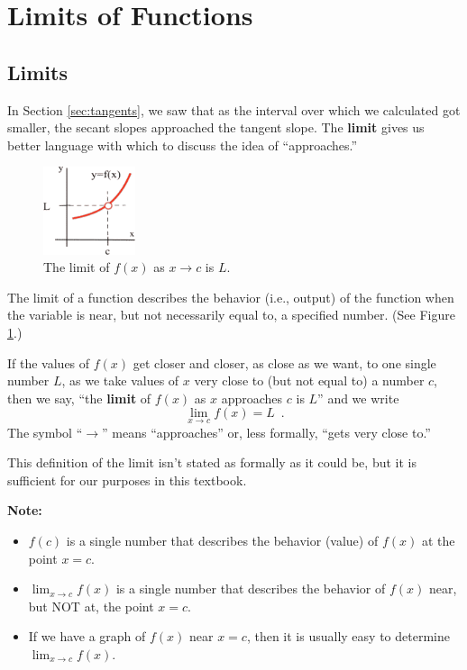 \section{Limits of Functions}
\label{sec:limits}

\subsection{Limits}
In Section \ref{sec:tangents}, we saw that as the interval over which we calculated got smaller, the secant slopes approached the tangent slope. The {\bf limit} gives us better language with which to discuss the idea of ``approaches.''
\begin{figure}
  \vspace{-20pt}
  \centering
    \includegraphics[width=0.24\textwidth]{img/chap2/image011.png} 
\caption{The limit of $f(x)$ as $x\to c$ is $L$.}
\label{fig:2-4-limits}
\vspace{-20pt}
\end{figure}
The limit of a function describes the behavior (i.e., output) of the function when the variable is near, but not necessarily equal to, a specified number. (See Figure \ref{fig:2-4-limits}.)

\begin{definition}[Limit]
If the values of $f(x)$ get closer and closer, as close as we want, to one single number $L$, as we take values of $x$ very close to (but not equal to) a number $c$, then we say, ``the {\bf limit} of $f(x)$ as $x$ approaches $c$ is $L$'' and we write
$$\lim_{x\to c}f(x)=L \enspace .$$
The symbol ``$\to$'' means ``approaches'' or, less formally, ``gets very close to.''
\end{definition}
This definition of the limit isn't stated as formally as it could be, but it is sufficient for our purposes in this textbook.

{\bf Note:}
    \begin{itemize}[label={}]
    \item $f(c)$ is a single number that describes the behavior (value) of $f(x)$ at the point $x=c$.
    \item $\displaystyle\lim_{x\to c}f(x)$ is a single number that describes the behavior of $f(x)$ near, but NOT at, the point $x=c$.
    \item If we have a graph of $f(x)$ near $x = c$, then it is usually easy to determine $\displaystyle\lim_{x\to c}f(x)$.
    \end{itemize}

